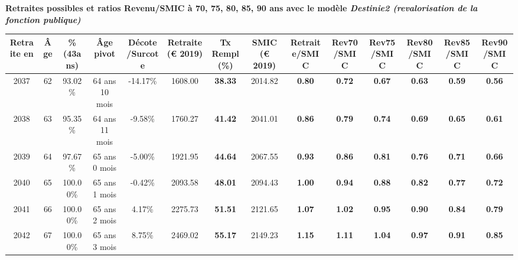  \vspace{0.1cm} 
{\bf \noindent Retraites possibles et ratios Revenu/SMIC à 70, 75, 80, 85, 90 ans avec le modèle \emph{Destinie2 (revalorisation de la fonction publique)}}  
 
\begin{adjustbox}{max width=\textwidth} 
\begin{tabular}[htb]{|c|c||c|c|c||c|c||c||c|c|c|c|c|c|} 
\hline 
 Retraite en &  Âge &  \%(43ans) &  Âge pivot &  Décote/Surcote &  Retraite (\euro{} 2019) &  Tx Rempl(\%) &  SMIC (\euro{} 2019) &  Retraite/SMIC &  Rev70/SMIC &  Rev75/SMIC &  Rev80/SMIC &  Rev85/SMIC &  Rev90/SMIC \\ 
\hline \hline 
 2037 &  62 &  93.02\% &  64 ans 10 mois &  -14.17\% &  1608.00 &  {\bf 38.33} &  2014.82 &  {\bf {\color{red} 0.80}} &  {\bf {\color{red} 0.72}} &  {\bf {\color{red} 0.67}} &  {\bf {\color{red} 0.63}} &  {\bf {\color{red} 0.59}} &  {\bf {\color{red} 0.56}} \\ 
\hline 
 2038 &  63 &  95.35\% &  64 ans 11 mois &  -9.58\% &  1760.27 &  {\bf 41.42} &  2041.01 &  {\bf {\color{red} 0.86}} &  {\bf {\color{red} 0.79}} &  {\bf {\color{red} 0.74}} &  {\bf {\color{red} 0.69}} &  {\bf {\color{red} 0.65}} &  {\bf {\color{red} 0.61}} \\ 
\hline 
 2039 &  64 &  97.67\% &  65 ans 0 mois &  -5.00\% &  1921.95 &  {\bf 44.64} &  2067.55 &  {\bf {\color{red} 0.93}} &  {\bf {\color{red} 0.86}} &  {\bf {\color{red} 0.81}} &  {\bf {\color{red} 0.76}} &  {\bf {\color{red} 0.71}} &  {\bf {\color{red} 0.66}} \\ 
\hline 
 2040 &  65 &  100.00\% &  65 ans 1 mois &  -0.42\% &  2093.58 &  {\bf 48.01} &  2094.43 &  {\bf {\color{red} 1.00}} &  {\bf {\color{red} 0.94}} &  {\bf {\color{red} 0.88}} &  {\bf {\color{red} 0.82}} &  {\bf {\color{red} 0.77}} &  {\bf {\color{red} 0.72}} \\ 
\hline 
 2041 &  66 &  100.00\% &  65 ans 2 mois &  4.17\% &  2275.73 &  {\bf 51.51} &  2121.65 &  {\bf 1.07} &  {\bf 1.02} &  {\bf {\color{red} 0.95}} &  {\bf {\color{red} 0.90}} &  {\bf {\color{red} 0.84}} &  {\bf {\color{red} 0.79}} \\ 
\hline 
 2042 &  67 &  100.00\% &  65 ans 3 mois &  8.75\% &  2469.02 &  {\bf 55.17} &  2149.23 &  {\bf 1.15} &  {\bf 1.11} &  {\bf 1.04} &  {\bf {\color{red} 0.97}} &  {\bf {\color{red} 0.91}} &  {\bf {\color{red} 0.85}} \\ 
\hline 
\hline 
\end{tabular} 
\end{adjustbox} 
 
